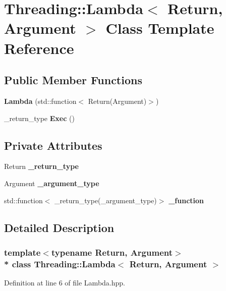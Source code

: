 \hypertarget{class_threading_1_1_lambda}{}\section{Threading\+:\+:Lambda$<$ Return, Argument $>$ Class Template Reference}
\label{class_threading_1_1_lambda}
\subsection*{Public Member Functions}
\begin{DoxyCompactItemize}
\item 
{\bfseries Lambda} (std\+::function$<$ Return(Argument)$>$)\hypertarget{class_threading_1_1_lambda_a1538670ee0a6ce0fc3f436a97a94f25a}{}\label{class_threading_1_1_lambda_a1538670ee0a6ce0fc3f436a97a94f25a}

\item 
\+\_\+return\+\_\+type {\bfseries Exec} ()\hypertarget{class_threading_1_1_lambda_a2a64c63c51be4f2a49efd983e0769d41}{}\label{class_threading_1_1_lambda_a2a64c63c51be4f2a49efd983e0769d41}

\end{DoxyCompactItemize}
\subsection*{Private Attributes}
\begin{DoxyCompactItemize}
\item 
Return {\bfseries \+\_\+return\+\_\+type}\hypertarget{class_threading_1_1_lambda_a9ed17784d05bb1d368a09861496291b2}{}\label{class_threading_1_1_lambda_a9ed17784d05bb1d368a09861496291b2}

\item 
Argument {\bfseries \+\_\+argument\+\_\+type}\hypertarget{class_threading_1_1_lambda_a5cfd24445bed42ab3afe75fd40304fe5}{}\label{class_threading_1_1_lambda_a5cfd24445bed42ab3afe75fd40304fe5}

\item 
std\+::function$<$ \+\_\+return\+\_\+type(\+\_\+argument\+\_\+type)$>$ {\bfseries \+\_\+function}\hypertarget{class_threading_1_1_lambda_a29c7aa5f9208d98ed165478cd160994a}{}\label{class_threading_1_1_lambda_a29c7aa5f9208d98ed165478cd160994a}

\end{DoxyCompactItemize}


\subsection{Detailed Description}
\subsubsection*{template$<$typename Return, Argument$>$\\*
class Threading\+::\+Lambda$<$ Return, Argument $>$}



Definition at line 6 of file Lambda.\+hpp.

